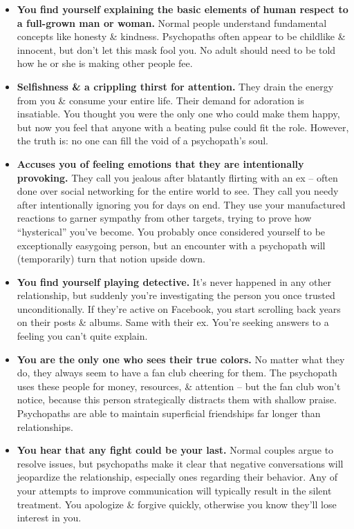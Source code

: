 \documentclass{article}
\numberwithin{equation}{section}
\begin{document}
\begin{itemize}
	\item \textbf{You find yourself explaining the basic elements of human respect to a full-grown man or woman.} Normal people understand fundamental concepts like honesty \& kindness. Psychopaths often appear to be childlike \& innocent, but don't let this mask fool you. No adult should need to be told how he or she is making other people fee.
	\item \textbf{Selfishness \& a crippling thirst for attention.} They drain the energy from you \& consume your entire life. Their demand for adoration is insatiable. You thought you were the only one who could make them happy, but now you feel that anyone with a beating pulse could fit the role. However, the truth is: no one can fill the void of a psychopath's soul.
	\item \textbf{Accuses you of feeling emotions that they are intentionally provoking.} They call you jealous after blatantly flirting with an ex -- often done over social networking for the entire world to see. They call you needy after intentionally ignoring you for days on end. They use your manufactured reactions to garner sympathy from other targets, trying to prove how ``hysterical'' you've become. You probably once considered yourself to be exceptionally easygoing person, but an encounter with a psychopath will (temporarily) turn that notion upside down.
	\item \textbf{You find yourself playing detective.} It's never happened in any other relationship, but suddenly you're investigating the person you once trusted unconditionally. If they're active on Facebook, you start scrolling back years on their posts \& albums. Same with their ex. You're seeking answers to a feeling you can't quite explain.
	\item \textbf{You are the only one who sees their true colors.} No matter what they do, they always seem to have a fan club cheering for them. The psychopath uses these people for money, resources, \& attention -- but the fan club won't notice, because this person strategically distracts  them with shallow praise. Psychopaths are able to maintain superficial friendships far longer than relationships.
	\item \textbf{You hear that any fight could be your last.} Normal couples argue to resolve issues, but psychopaths make it clear that negative conversations will jeopardize the relationship, especially ones regarding their behavior. Any of your attempts to improve communication will typically result in the silent treatment. You apologize \& forgive quickly, otherwise you know they'll lose interest in you.

\end{itemize}
\end{document}
